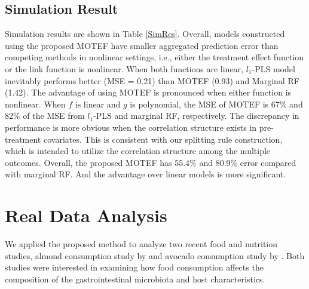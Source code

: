 \documentclass[smallextended]{svjour3}
\begin{document}
\subsection{Simulation Result}\label{3.2}
Simulation results are shown in Table \ref{SimRes}. Overall, models constructed using the proposed MOTEF have smaller aggregated prediction error than competing methods in nonlinear settings, i.e., either the treatment effect function or the link function is nonlinear. When both functions are linear, $l_1$-PLS model inevitably performs better (MSE = 0.21) than MOTEF (0.93) and Marginal RF (1.42). The advantage of using MOTEF is pronounced when either function is nonlinear. When $f$ is linear and $g$ is polynomial, the MSE of MOTEF is 67\% and 82\% of the MSE from $l_1$-PLS and marginal RF, respectively. The discrepancy in performance is more obvious when the correlation structure exists in pre-treatment covariates. This is consistent with our splitting rule construction, which is intended to utilize the correlation structure among the multiple outcomes. Overall, the proposed MOTEF has 55.4\% and 80.9\% error compared with marginal RF. And the advantage over linear models is more significant. 

\section{Real Data Analysis}\label{realdata}
We applied the proposed method to analyze two recent food and nutrition studies, almond consumption study by \citet{holscher2018almond} and avocado consumption study by \citet{Avocado}. Both studies were interested in examining how food consumption affects the composition of the gastrointestinal microbiota and host characteristics. 
\end{document}
